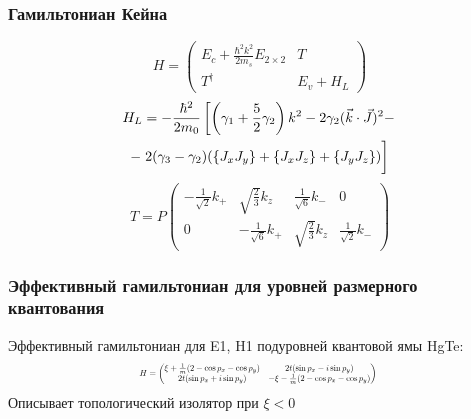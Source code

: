 \documentclass{beamer}
\begin{document}
\begin{frame}
    \frametitle{Гамильтониан Кейна}
    \begin{equation}
        H = \begin{pmatrix}
                    E_c + \frac{\hbar^2 k^2}{2m_s}E_{2\times 2} & T \\
                    T^\dagger & E_v + H_{L}
            \end{pmatrix}
    \end{equation}
    \begin{multline*}
        H_L = -\frac{\hbar^2}{2m_0}\left[
                \left(\gamma_1 + \frac{5}{2}\gamma_2\right)k^2 -
                2\gamma_2(\vec{k} \cdot \vec{J})^2 - \right. \\
                - \left.2(\gamma_3 - \gamma_2)(\{J_x J_y\} + \{J_x J_z\} + \{J_y J_z\})
                \vphantom{\frac{1}{2}}\right]
    \end{multline*}
    \begin{equation*}
        T = P\begin{pmatrix}
               -\frac{1}{\sqrt{2}}k_{+} & \sqrt{\frac{2}{3}}k_z  
                        & \frac{1}{\sqrt{6}} k_{-} & 0 \\
                0 & -\frac{1}{\sqrt{6}} k_{+} 
                        & \sqrt{\frac{2}{3}}k_z & \frac{1}{\sqrt{2}} k_{-} 
             \end{pmatrix}
    \end{equation*}
\end{frame}

\begin{frame}
    \frametitle{Эффективный гамильтониан для уровней размерного квантования}
        Эффективный гамильтониан для E1, H1 подуровней квантовой ямы HgTe:
        \begin{equation}
           \label{eff_so_ham}
            \scalebox{0.6}{%
            $
            H = \left(\begin{matrix}
                    \xi + \frac{1}{m}(2 - \cos{p_x} - \cos{p_y}) & 
                            2t(\sin{p_x} - i\sin{p_y})   \\
                    2t(\sin{p_x} + i\sin{p_y}) & 
                           - \xi - \frac{1}{m}(2 - \cos{p_x} - \cos{p_y}) \\
                \end{matrix}\right)
            $
            }
        \end{equation}
        Описывает топологический изолятор при $\xi < 0$
\end{frame}
\end{document}
